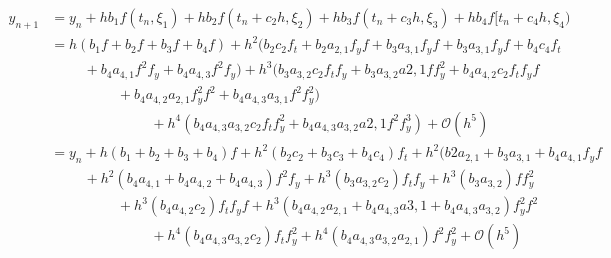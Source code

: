 \documentclass[12pt,a4paper]{article}
\begin{document}
\begin{align*}
y_{n+1} &= y_n + hb_1f(t_n, \xi_1) + hb_2f(t_n + c_2h , \xi_2) + hb_3f(t_n + c_3h , \xi_3) + hb_4f[t_n + c_4h, \xi_4) \\
&= h( b_1f + b_2f + b_3f + b_4f ) + h^2( b_2c_2f_t + b_2a_{2,1}f_yf + b_3a_{3,1}f_yf + b_3a_{3,1}f_yf + b_4c_4f_t \\
& \hspace{1cm}+ b_4a_{4,1}f^2f_y + b_4a_{4,3}f^2f_y) + h^3(b_3a_{3,2}c_2f_tf_y + b_3a_{3,2}a{2,1}ff_y^2 + b_4a_{4,2}c_2f_tf_yf \\
& \hspace{2cm}+ b_4a_{4,2}a_{2,1}f_y^2f^2 + b_4a_{4,3}a_{3,1}f^2f_y^2) \\
&\hspace{3cm}+ h^4(b_4a_{4,3}a_{3,2}c_2f_tf_y^2 + b_4a_{4,3}a_{3,2}a{2,1}f^2f_y^3) + \mathcal{O}(h^5) \\
&= y_n + h(b_1 + b_2 + b_3 + b_4)f + h^2(b_2c_2 + b_3c_3 + b_4c_4)f_t + h^2(b2a_{2,1} + b_3a_{3,1} + b_4a_{4,1}f_yf \\
& \hspace{1cm} + h^2(b_4a_{4,1} + b_4a_{4,2} + b_4a_{4,3})f^2f_y + h^3(b_3a_{3,2}c_2)f_tf_y + h^3(b_3a_{3,2})ff_y^2 \\
& \hspace{2cm} + h^3(b_4a_{4,2}c_2)f_tf_yf + h^3(b_4a_{4,2}a_{2,1} + b_4a_{4,3}a{3,1} + b_4a_{4,3}a_{3,2})f_y^2f^2 \\
& \hspace{3cm}+ h^4(b_4a_{4,3}a_{3,2}c_2)f_tf_y^2 + h^4(b_4a_{4,3}a_{3,2}a_{2,1})f^2f_y^2 + \mathcal{O}(h^5)
\end{align*}

\end{document}
